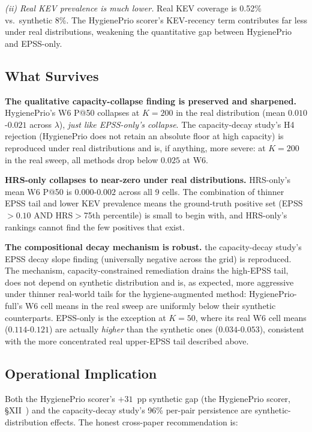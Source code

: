 \textit{(ii) Real KEV prevalence is much lower.} Real KEV coverage is
0.52\% vs.\ synthetic 8\%. The HygienePrio scorer's KEV-recency term
contributes far less under real distributions, weakening the
quantitative gap between HygienePrio and EPSS-only.

\subsection{What Survives}

\textbf{The qualitative capacity-collapse finding is preserved and
sharpened.} HygienePrio's W6 P@50 collapses at $K = 200$ in the real
distribution (mean $0.010$-$0.021$ across $\lambda$), \emph{just like
EPSS-only's collapse}. The capacity-decay study's H4 rejection (HygienePrio does not
retain an absolute floor at high capacity) is reproduced under real
distributions and is, if anything, more severe: at $K = 200$ in the
real sweep, all methods drop below $0.025$ at W6.

\textbf{HRS-only collapses to near-zero under real distributions.}
HRS-only's mean W6 P@50 is $0.000$-$0.002$ across all 9 cells. The
combination of thinner EPSS tail and lower KEV prevalence means the
ground-truth positive set (EPSS$>0.10$ AND HRS$>$75th percentile) is
small to begin with, and HRS-only's rankings cannot find the few
positives that exist.

\textbf{The compositional decay mechanism is robust.} the capacity-decay study's
EPSS decay slope finding (universally negative across the grid) is
reproduced. The mechanism, capacity-constrained remediation
drains the high-EPSS tail, does not depend on synthetic
distribution and is, as expected, more aggressive under thinner
real-world tails for the hygiene-augmented method: HygienePrio-full's
W6 cell means in the real sweep are uniformly below their synthetic
counterparts. EPSS-only is the exception at $K = 50$, where its real
W6 cell means ($0.114$-$0.121$) are actually \emph{higher} than the
synthetic ones ($0.034$-$0.053$), consistent with the more
concentrated real upper-EPSS tail described above.

\subsection{Operational Implication}

Both the HygienePrio scorer's $+31$~pp synthetic gap (the HygienePrio scorer,
\S XII~\cite{paper4hygieneprio}) and the capacity-decay study's 96\% per-pair
persistence are synthetic-distribution
effects. The honest cross-paper recommendation is:

